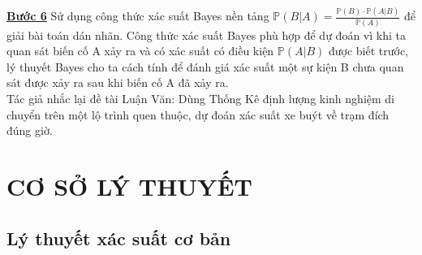 \documentclass[a4paper, 13pt]{report}
\begin{document}
\textbf{\underline{Bước 6}} Sử dụng công thức xác suất Bayes nền tảng $\mathbb{P}(B|A) = \frac{\mathbb{P}(B) \cdot \mathbb{P}(A|B)}{\mathbb{P}(A)}$ để giải bài toán dán nhãn. Công thức xác suất Bayes phù hợp để dự đoán vì khi ta quan sát biến cố A xảy ra và có xác suất có điều kiện $\mathbb{P}(A|B)$ được biết trước, lý thuyết Bayes cho ta cách tính để đánh giá xác suất một sự kiện B chưa quan sát được xảy ra sau khi biến cố A đã xảy ra.\\
Tác giả nhắc lại đề tài Luận Văn: Dùng Thống Kê định lượng kinh nghiệm di chuyển trên một lộ trình quen thuộc, dự đoán xác suất xe buýt về trạm đích đúng giờ.
\pagebreak
\chapter{CƠ SỞ LÝ THUYẾT}
\section{Lý thuyết xác suất cơ bản}
\end{document}
